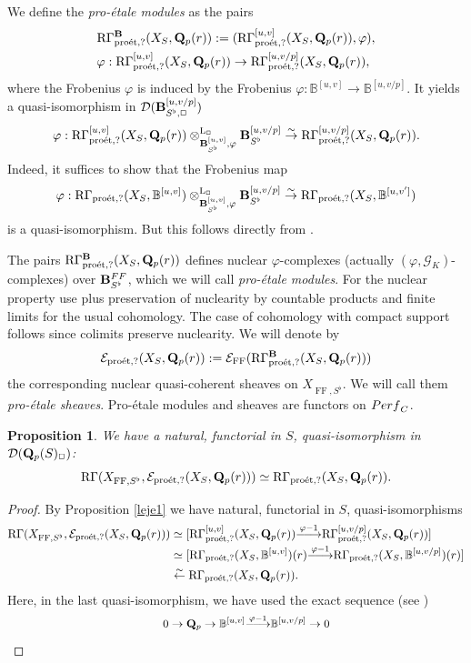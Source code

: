 \documentclass[10pt,reqno]{amsart}
\let\cal\mathcal
\newtheorem{proposition}[equation]{Proposition}
\theoremstyle{definition}
\theoremstyle{remark}
\def\lomapr#1{\smash{\mathop{\relbar\joinrel\longrightarrow}\limits^{#1}}}
\def\phi{\varphi}
\newcommand{\dr}{\operatorname{dR} }
\newcommand{\syn}{\operatorname{syn} }
\newcommand{\proeet}{\operatorname{pro\acute{e}t} }
\newcommand{\hk}{\operatorname{HK} }
\newcommand{\LL}{\operatorname{L} }
\newcommand{\FF}{\operatorname{FF} }
\newcommand{\sg}{{\mathcal{G}}}
\newcommand{\se}{{\mathcal{E}}}
\newcommand{\sd}{{\mathcal{D}}}
\numberwithin{equation}{section}
\def\R{{\mathrm R}}
\def\Q{{\bf Q}} \def\Z{{\bf Z}}
\def\EEE{${\cal E}_{\dr}$, ${\cal E}_{\rm FF}$, ${\cal E}_{\hk}$, ${\cal E}_{\proeet}$, ${\cal E}_{\syn}$}
\numberwithin{equation}{section}
\begin{document}
    We define the {\em pro-\'etale  modules} as the pairs
 \begin{align*}
&  \R\Gamma^{\B}_{\proeet,?}(X_S,\Q_p(r))  :=( \R\Gamma_{\proeet,?}^{{[u,v]}}(X_S,\Q_p(r)),\phi),\\
&   \phi:  \R\Gamma_{\proeet,?}^{{[u,v]}}(X_S,\Q_p(r))  \to  \R\Gamma_{\proeet,?}^{{[u,v/p]}}(X_S,\Q_p(r)),
 \end{align*}
 where the Frobenius $\phi$ is induced by the   Frobenius $\phi: {\mathbb B}^{[u,v]}\to {\mathbb B}^{[u,v/p]}$. It
 yields a quasi-isomorphism in $\sd(\B^{[u,v/p]}_{S^{\flat}, \Box})$
 $$\phi:  \R\Gamma_{\proeet,?}^{{[u,v]}}(X_S,\Q_p(r))\otimes^{\LL_{\Box}}_{\B_{S^{\flat}}^{[u,v]},\phi}\B_{S^{\flat}}^{[u,v/p]}\stackrel{\sim}{\to } \R\Gamma_{\proeet,?}^{{[u,v/p]}}(X_S,\Q_p(r)).$$
 Indeed, it suffices  to show that the Frobenius map
 $$
  \phi:  \R\Gamma_{\proeet,?}(X_S,{\mathbb B}^{[u,v]})\otimes^{\LL_{\Box}}_{\B_{S^{\flat}}^{[u,v]},\phi}\B_{S^{\flat}}^{[u,v/p]}\stackrel{\sim}{\to } \R\Gamma_{\proeet,?}(X_S, {\mathbb B}^{[u,v^{\prime}]})
$$
 is a quasi-isomorphism. But this follows directly from \cite[Lemma 4.8]{GB2}.

 
 The pairs  $\R\Gamma^{\B}_{\proeet,?}(X_S,\Q_p(r))$
  defines    nuclear $\phi$-complexes (actually  $(\phi,\sg_K)$-complexes) over $\B^{\rm FF}_{S^{\flat}}$, which we will call  {\em pro-\'etale  modules}. For the nuclear property use \cite[Lemma 6.15]{GB2} plus preservation of nuclearity by countable products and finite limits for the usual cohomology.
  The case of  cohomology with compact support follows since  colimits preserve nuclearity.    We will denote \index{E@\EEE}by
$$
\se_{\proeet,?}(X_S,\Q_p(r)):=\se_{\FF}(\R\Gamma^{\B}_{\proeet,?}(X_S,\Q_p(r)))
$$
the corresponding nuclear quasi-coherent sheaves on $X_{\FF,S^{\flat}}$. We will call them {\em pro-\'etale  sheaves}. 
Pro-\'etale  modules and sheaves  are functors on ${\rm Perf}_C$. 


 \begin{proposition}\label{comp2b}
  We have  a natural, functorial in $S$,  quasi-isomorphism in $\sd(\Q_{p}(S)_{\Box})$:
$$\R\Gamma(X_{\FF,S^{\flat}},\se_{\proeet,?}(X_S,\Q_p(r)))  \simeq\R\Gamma_{\proeet,?}(X_S,\Q_p(r)).
$$
 \end{proposition}
 \begin{proof}By  Proposition \ref{leje1} we have natural, functorial in $S$, quasi-isomorphisms
 \begin{align*}
 \R\Gamma(X_{\FF,S^{\flat}},\se_{\proeet,?}(X_S,\Q_p(r)))   & \simeq [\R\Gamma_{\proeet,?}^{{[u,v]}}(X_S,\Q_p(r))\lomapr{\phi-1}\R\Gamma_{\proeet,?}^{{[u,v/p]}}(X_S,\Q_p(r))]\\
 & \simeq [\R\Gamma_{\proeet,?}(X_S,{\mathbb B}^{[u,v]})(r)\lomapr{\phi-1}\R\Gamma_{\proeet,?}(X_S,{\mathbb B}^{[u,v/p]})(r)]\\
  & \stackrel{\sim}{\leftarrow}\R\Gamma_{\proeet,?}(X_S,\Q_p(r)).
 \end{align*}
 Here, in the last quasi-isomorphism, we have used the exact sequence (see \cite[Lemma 2.23]{CN1})
 $$
 \phantom{XXXXXXXXXXXXXXX}0\to\Q_p\to {\mathbb B}^{[u,v]}\lomapr{\phi-1}{\mathbb B}^{[u,v/p]}\to 0\phantom{XXXXXXXXXXXXX} \qedhere
 $$
 \end{proof}
\end{document}
